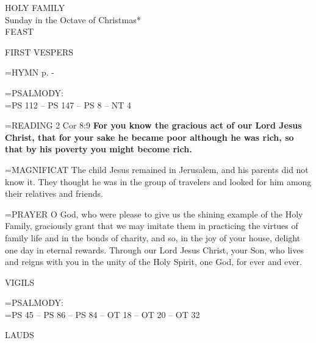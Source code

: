 \begin{center}\normalsize HOLY FAMILY\\
\footnotesize Sunday in the Octave of Christmas*\\
\footnotesize FEAST\\
\end{center}

\begin{flushleft}\normalsize FIRST VESPERS\\\end{flushleft}

\hangindent=\parindent \small{\uppercase{HYMN} p. \pageref{christmas:firstHymn}-\pageref{christmas:lastHymn}\\}

\hangindent=\parindent \small{PSALMODY:}\\
\hangindent=\parindent  PS 112 -- PS 147 -- PS 8 -- NT 4\vspace{0.5em}


\hangindent=\parindent \small{\uppercase{READING}}    2 Cor 8:9 \textbf{   For you know the gracious act of our Lord Jesus Christ, that for your sake he became poor although he was rich, so that by his poverty you might become rich. \\}

\hangindent=\parindent \small{MAGNIFICAT 	The child Jesus remained in Jerusalem, and his parents did not know it. They thought he was in the group of travelers and looked for him among their relatives and friends.\\}

\hangindent=\parindent \small{PRAYER 	O God, who were please to give us the shining example of the Holy Family, graciously grant that we may imitate them in practicing the virtues of family life and in the bonds of charity, and so, in the joy of your house, delight one day in eternal rewards. Through our Lord Jesus Christ, your Son, who lives and reigns with you in the unity of the Holy Spirit, one God, for ever and ever.}

\begin{flushleft}\normalsize VIGILS\\\end{flushleft}

\hangindent=\parindent \small{PSALMODY:}\\
\hangindent=\parindent  PS 45 -- PS 86 -- PS 84 -- OT 18 -- OT 20 -- OT 32\vspace{0.5em}

\begin{flushleft}\normalsize LAUDS\\\end{flushleft}

